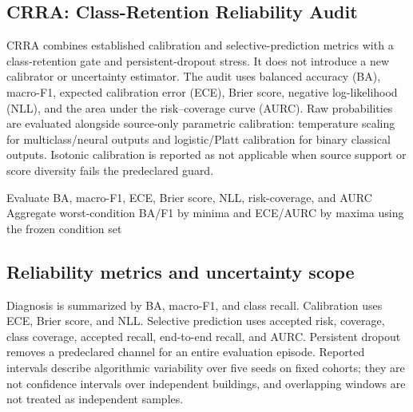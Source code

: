 \documentclass[preprint,12pt]{elsarticle}
\begin{document}
\subsection{CRRA: Class-Retention Reliability Audit}
CRRA combines established calibration and selective-prediction metrics with a class-retention gate and persistent-dropout stress. It does not introduce a new calibrator or uncertainty estimator. The audit uses balanced accuracy (BA), macro-F1, expected calibration error (ECE), Brier score, negative log-likelihood (NLL), and the area under the risk--coverage curve (AURC). Raw probabilities are evaluated alongside source-only parametric calibration: temperature scaling for multiclass/neural outputs and logistic/Platt calibration for binary classical outputs. Isotonic calibration is reported as not applicable when source support or score diversity fails the predeclared guard.

\begin{algorithm}[H]
\caption{Class-Retention Reliability Audit (CRRA)}
\label{alg:crra}
Evaluate BA, macro-F1, ECE, Brier score, NLL, risk-coverage, and AURC\;
Aggregate worst-condition BA/F1 by minima and ECE/AURC by maxima using the frozen condition set\;
\;
\end{algorithm}

\subsection{Reliability metrics and uncertainty scope}
Diagnosis is summarized by BA, macro-F1, and class recall. Calibration uses ECE, Brier score, and NLL. Selective prediction uses accepted risk, coverage, class coverage, accepted recall, end-to-end recall, and AURC. Persistent dropout removes a predeclared channel for an entire evaluation episode. Reported intervals describe algorithmic variability over five seeds on fixed cohorts; they are not confidence intervals over independent buildings, and overlapping windows are not treated as independent samples.
\end{document}
